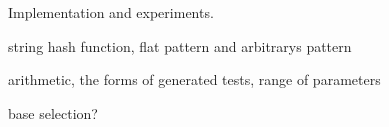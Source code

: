 
Implementation and experiments.

string hash function, flat pattern and arbitrarys pattern

arithmetic, the forms of generated tests, range of parameters 

base selection?